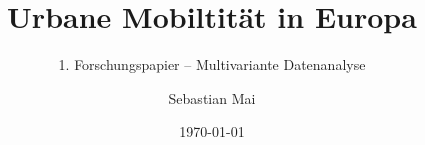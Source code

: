 \documentclass[a4paper,12pt,titlepage]{scrartcl}
\title{Urbane Mobiltität in Europa}
\subtitle{1. Forschungspapier – Multivariante Datenanalyse}
\author{Sebastian Mai}
\date{\today} %
\begin{document}
\maketitle
\tableofcontents



\newpage
\sloppy
\printbibliography
\listoftables
\end{document}
